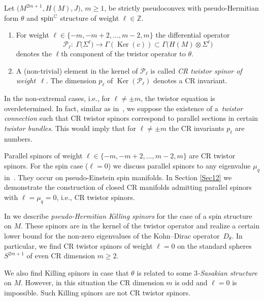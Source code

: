 \documentclass[10pt,a4paper]{amsart}
\numberwithin{equation}{section}
\newcommand{\ZZ}{\mathbb{Z}}
\newcommand{\CC}{\mathbb{C}}
\begin{document}
\begin{Definition} Let $\big(M^{2m+1},H(M),J\big)$, $m\geq 1$, be strictly pseudoconvex
with pseudo-Her\-mi\-tian form $\theta$ and ${\rm spin}^\CC$ structure of weight $\ell\in\ZZ$.
\begin{enumerate}\itemsep=0pt
\item[(a)] For weight $\ell\in\{-m,-m+2,\dots,m-2,m\}$
the differential operator
\[
\mathcal{P}_\ell\colon \ \Gamma\big(\Sigma^{\ell}\big) \to \Gamma(\operatorname{Ker}(c)) \subset \Gamma\big(H(M)\otimes \Sigma^{\ell}\big)
\]
denotes the $\ell$th component of the twistor operator to $\theta$.

\item[(b)] A (non-trivial) element in the kernel of $\mathcal{P}_\ell$ is called \emph{CR twistor spinor of weight~$\ell$}.
The dimension $p_\ell$ of $\operatorname{Ker}(\mathcal{P}_\ell)$ denotes a CR invariant.
\end{enumerate}
\end{Definition}

In the non-extremal cases, i.e., for $\ell\neq \pm m$, the twistor equation is overdetermined.
In fact, similar as in~\cite{Pil}, we suppose the existence of a~{\em twistor connection} such that CR twistor spinors correspond to parallel sections in certain {\em twistor bundles}. This would
imply that for $\ell\neq \pm m$ the CR invariants $p_\ell$ are numbers.

\begin{Example} Parallel spinors of weight $\ell\in\{-m,-m+2,\dots,m-2,m\}$ are CR twistor spinors. For the spin case ($\ell=0$)
we discuss parallel spinors to any eigenvalue $\mu_q$ in~\cite{LeiN2}. They occur on pseudo-Einstein spin manifolds. In Section \ref{Sec12} we
demonstrate the construction of closed CR manifolds admitting parallel spinors with $\ell=\mu_q=0$, i.e., CR twistor spinors.
\end{Example}

\begin{Example}
In \cite{LeiN1} we describe {\em pseudo-Hermitian Killing spinors} for the case of a spin structure on $M$.
These spinors are in the kernel of the twistor operator and realize a certain lower bound for the non-zero eigenvalues of the Kohn--Dirac operator~$D_\theta$.
In particular, we find CR twistor spinors of weight $\ell=0$ on the standard spheres $S^{2m+1}$ of even CR dimension $m\geq 2$.

We also find Killing spinors in case that $\theta$
is related to some {\em $3$-Sasakian structure} on $M$. However, in this situation the CR dimension $m$ is odd and
$\ell=0$ is impossible. Such Killing spinors are not CR twistor spinors.
\end{Example}
\end{document}
